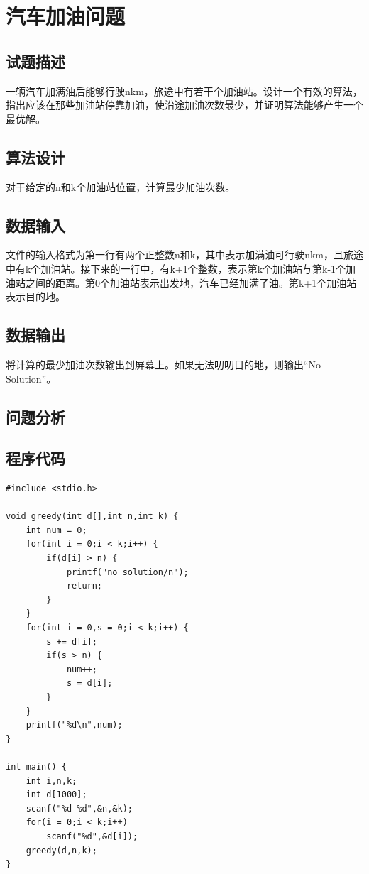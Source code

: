 \documentclass[UTF8]{ctexart}
\begin{document}
    \section{汽车加油问题}
    \subsection{试题描述}
    一辆汽车加满油后能够行驶nkm，旅途中有若干个加油站。设计一个有效的算法，指出应该在那些加油站停靠加油，使沿途加油次数最少，并证明算法能够产生一个最优解。
    \subsection{算法设计}
    对于给定的n和k个加油站位置，计算最少加油次数。
    \subsection{数据输入}
    文件的输入格式为第一行有两个正整数n和k，其中表示加满油可行驶nkm，且旅途中有k个加油站。接下来的一行中，有k+1个整数，表示第k个加油站与第k-1个加油站之间的距离。第0个加油站表示出发地，汽车已经加满了油。第k+1个加油站表示目的地。
    \subsection{数据输出}
    将计算的最少加油次数输出到屏幕上。如果无法叨叨目的地，则输出“No Solution”。
    \subsection{问题分析}

    \subsection{程序代码}
    \begin{small}
    \begin{lstlisting}
#include <stdio.h>   
  
void greedy(int d[],int n,int k) {   
    int num = 0;   
    for(int i = 0;i < k;i++) {   
        if(d[i] > n) {   
            printf("no solution/n");   
            return;   
        }   
    }   
    for(int i = 0,s = 0;i < k;i++) {   
        s += d[i];   
        if(s > n) {   
            num++;   
            s = d[i];   
        }   
    }   
    printf("%d\n",num);   
}   
             
int main() {   
    int i,n,k;   
    int d[1000];   
    scanf("%d %d",&n,&k);   
    for(i = 0;i < k;i++)   
        scanf("%d",&d[i]);   
    greedy(d,n,k);   
}  
    \end{lstlisting}
    \end{small}
\end{document}

